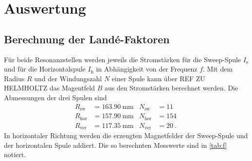 \section{Auswertung}
\label{sec:Auswertung}

\subsection{Berechnung der Landé-Faktoren}
\label{ssec:lande}

Für beide Resonanzstellen werden jeweils die Stromstärken für die Sweep-Spule $I_\text{s}$ und für die Horizontalspule $I_\text{h}$ in Abhängigkeit von der Frequenz $f$.
Mit dem Radius $R$ und der Windungszahl $N$ einer Spule kann über REF ZU HELMHOLTZ das Magentfeld $B$ aus den Stromstärken berechnet werden.
Die Abmessungen der drei Spulen sind 
\begin{align*}
    R_\text{sw} &= \qty{163.90}{\milli\meter} & N_\text{sw} &= \qty{11}{}\\
    R_\text{hor} &= \qty{157.90}{\milli\meter} & N_\text{hor} &= \qty{154}{}\\
    R_\text{ver} &= \qty{117.35}{\milli\meter} & N_\text{ver} &= \qty{20}{}.
\end{align*}
In horizontaler Richtung werden die erzeugten Magnetfelder der Sweep-Spule und der horizontalen Spule addiert.
Die so berechnten Messwerte sind in \autoref{tab:f} notiert.

